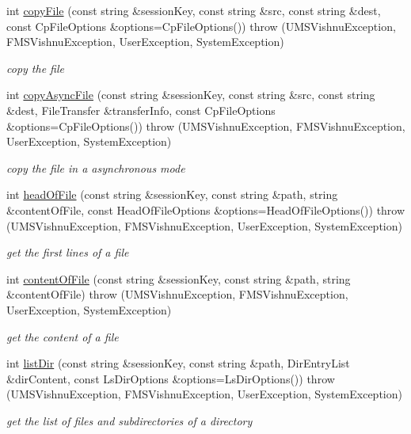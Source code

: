 \begin{DoxyCompactItemize}
int \hyperlink{namespacevishnu_a9c08b2960915cf530451df2c7e0d2316}{copyFile} (const string \&sessionKey, const string \&src, const string \&dest, const CpFileOptions \&options=CpFileOptions())  throw (UMSVishnuException, FMSVishnuException, UserException, SystemException)
\begin{DoxyCompactList}\small\item\em copy the file \item\end{DoxyCompactList}\item 
int \hyperlink{namespacevishnu_aa1f91396026194dd4f815035ec6b1f64}{copyAsyncFile} (const string \&sessionKey, const string \&src, const string \&dest, FileTransfer \&transferInfo, const CpFileOptions \&options=CpFileOptions())  throw (UMSVishnuException, FMSVishnuException, UserException, SystemException)
\begin{DoxyCompactList}\small\item\em copy the file in a asynchronous mode \item\end{DoxyCompactList}\item 
int \hyperlink{namespacevishnu_a2ce4c436458a99e531b2a2fe55c60854}{headOfFile} (const string \&sessionKey, const string \&path, string \&contentOfFile, const HeadOfFileOptions \&options=HeadOfFileOptions())  throw (UMSVishnuException, FMSVishnuException, UserException, SystemException)
\begin{DoxyCompactList}\small\item\em get the first lines of a file \item\end{DoxyCompactList}\item 
int \hyperlink{namespacevishnu_a626981a5333a6cf9980ecab82a130fe5}{contentOfFile} (const string \&sessionKey, const string \&path, string \&contentOfFile)  throw (UMSVishnuException, FMSVishnuException, UserException, SystemException)
\begin{DoxyCompactList}\small\item\em get the content of a file \item\end{DoxyCompactList}\item 
int \hyperlink{namespacevishnu_a37f564b7b023409e54c4893e53e00602}{listDir} (const string \&sessionKey, const string \&path, DirEntryList \&dirContent, const LsDirOptions \&options=LsDirOptions())  throw (UMSVishnuException, FMSVishnuException, UserException, SystemException)
\begin{DoxyCompactList}\small\item\em get the list of files and subdirectories of a directory \item\end{DoxyCompactList}\item 

\end{DoxyCompactItemize}
